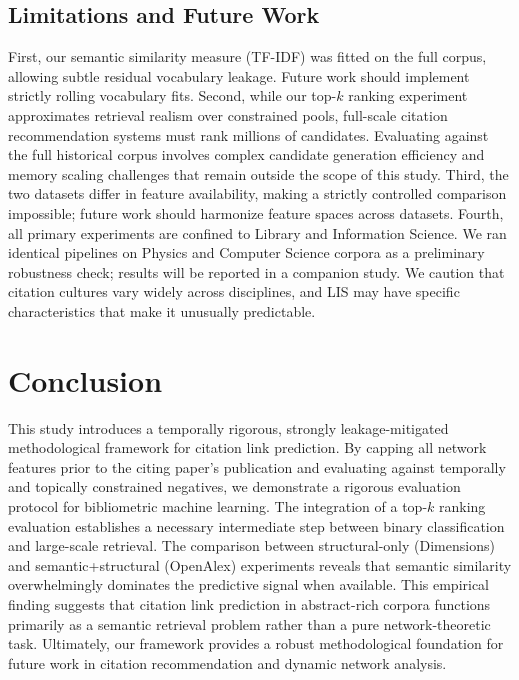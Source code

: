 \documentclass[11pt,a4paper]{article}
\begin{document}
\subsection{Limitations and Future Work}
First, our semantic similarity measure (TF-IDF) was fitted on the full corpus, allowing subtle residual vocabulary leakage. Future work should implement strictly rolling vocabulary fits. Second, while our top-$k$ ranking experiment approximates retrieval realism over constrained pools, full-scale citation recommendation systems must rank millions of candidates. Evaluating against the full historical corpus involves complex candidate generation efficiency and memory scaling challenges that remain outside the scope of this study. Third, the two datasets differ in feature availability, making a strictly controlled comparison impossible; future work should harmonize feature spaces across datasets. Fourth, all primary experiments are confined to Library and Information Science. We ran identical pipelines on Physics and Computer Science corpora as a preliminary robustness check; results will be reported in a companion study. We caution that citation cultures vary widely across disciplines, and LIS may have specific characteristics that make it unusually predictable.

\section{Conclusion}
\label{sec:conclusion}
This study introduces a temporally rigorous, strongly leakage-mitigated methodological framework for citation link prediction. By capping all network features prior to the citing paper's publication and evaluating against temporally and topically constrained negatives, we demonstrate a rigorous evaluation protocol for bibliometric machine learning. The integration of a top-$k$ ranking evaluation establishes a necessary intermediate step between binary classification and large-scale retrieval. The comparison between structural-only (Dimensions) and semantic+structural (OpenAlex) experiments reveals that semantic similarity overwhelmingly dominates the predictive signal when available. This empirical finding suggests that citation link prediction in abstract-rich corpora functions primarily as a semantic retrieval problem rather than a pure network-theoretic task. Ultimately, our framework provides a robust methodological foundation for future work in citation recommendation and dynamic network analysis.



\end{document}
